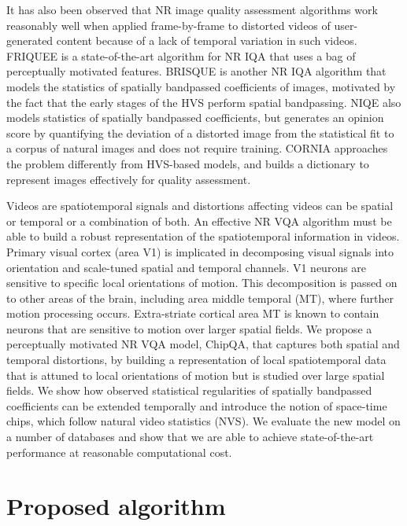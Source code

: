 \documentclass[conference]{IEEEtran}
\begin{document}
It has also been observed \cite{zhengzhong} that NR image quality assessment algorithms work reasonably well when applied frame-by-frame to distorted videos of user-generated content because of a lack of temporal variation in such videos. FRIQUEE\cite{friquee} is a state-of-the-art algorithm for NR IQA that uses a bag of perceptually motivated features. BRISQUE\cite{brisque} is another NR IQA algorithm that models the statistics of spatially bandpassed coefficients of images, motivated by the fact that the early stages of the HVS perform spatial bandpassing. NIQE\cite{niqe} also models statistics of spatially bandpassed coefficients, but generates an opinion score by quantifying the deviation of a distorted image from the statistical fit to a corpus of natural images and does not require training. CORNIA\cite{cornia} approaches the problem differently from HVS-based models, and builds a dictionary to represent images effectively for quality assessment.

 Videos are spatiotemporal signals and distortions affecting videos can be spatial or temporal or a combination of both. An effective NR VQA algorithm must be able to build a robust representation of the spatiotemporal information in videos. Primary visual cortex (area V1) is implicated in decomposing visual signals into orientation and scale-tuned spatial and temporal channels. V1 neurons are sensitive to specific local orientations of motion. This decomposition is passed on to other areas of the brain, including area middle temporal (MT), where further motion processing occurs. Extra-striate cortical area MT is known to contain neurons that are sensitive to motion over larger spatial fields\cite{movie,simoncelli}. We propose a perceptually motivated NR VQA model, ChipQA, that captures both spatial and temporal distortions, by building a representation of local spatiotemporal data that is  attuned to local orientations of motion but is studied over large spatial fields. We show how observed statistical regularities of spatially bandpassed coefficients can be extended temporally and introduce the notion of space-time chips, which follow natural video statistics (NVS). We evaluate the new model on a number of databases and show that we are able to achieve state-of-the-art performance at reasonable computational cost.
\section{Proposed algorithm}
\end{document}
